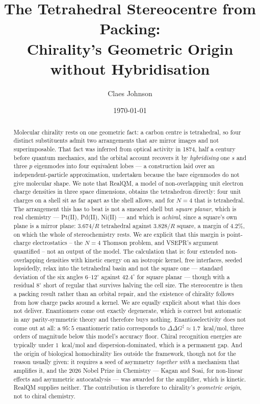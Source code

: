 \documentclass[11pt]{article}
\title{The Tetrahedral Stereocentre from Packing:\\
\large Chirality's Geometric Origin without Hybridisation}
\author[1]{Claes Johnson}
\affil[1]{KTH Royal Institute of Technology, SE-100 44 Stockholm, Sweden\\
\small\texttt{claesjohnson@gmail.com}}
\date{\today}
\begin{document}
\maketitle

\begin{abstract}
Molecular chirality rests on one geometric fact: a carbon centre is tetrahedral, so four distinct
substituents admit two arrangements that are mirror images and not superimposable. That fact was
inferred from optical activity in 1874, half a century before quantum mechanics, and the orbital
account recovers it by \emph{hybridising} one $s$ and three $p$ eigenmodes into four equivalent
lobes --- a construction laid over an independent-particle approximation, undertaken because the
bare eigenmodes do not give molecular shape. We note that RealQM, a model of non-overlapping unit
electron charge densities in three space dimensions, obtains the tetrahedron directly: four unit
charges on a shell sit as far apart as the shell allows, and for $N=4$ that is tetrahedral. The
arrangement this has to beat is not a smeared shell but \emph{square planar}, which is real
chemistry --- Pt(II), Pd(II), Ni(II) --- and which is \emph{achiral}, since a square's own plane is
a mirror plane: $3.674/R$ tetrahedral against $3.828/R$ square, a margin of $4.2\%$, on which the
whole of stereochemistry rests. We are explicit that this margin is point-charge electrostatics --
the $N=4$ Thomson problem, and VSEPR's argument quantified -- not an output of the model. The
calculation that is: four extended non-overlapping densities with kinetic energy on an isotropic
kernel, free interfaces, seeded lopsidedly, relax into the tetrahedral basin and not the square one
--- standard deviation of the six angles $6$--$12^\circ$ against $42.4^\circ$ for square planar ---
though with a residual $8^\circ$ short of regular that survives halving the cell size.
The stereocentre is then a packing result rather than an orbital repair, and the existence of
chirality follows from how charge packs around a kernel. We are equally explicit about what this
does not deliver. Enantiomers come out exactly degenerate, which is correct but automatic in any
parity-symmetric theory and therefore buys nothing. Enantioselectivity does not come out at all:
a $95{:}5$ enantiomeric ratio corresponds to $\Delta\Delta G^{\ddagger} \approx 1.7$~kcal/mol,
three orders of magnitude below this model's accuracy floor. Chiral recognition energies are
typically under $1$~kcal/mol and dispersion-dominated, which is a permanent gap. And the origin of
biological homochirality lies outside the framework, though not for the reason usually given: it
requires a seed of asymmetry \emph{together with} a mechanism that amplifies it, and the 2026 Nobel
Prize in Chemistry --- Kagan and Soai, for non-linear effects and asymmetric autocatalysis --- was
awarded for the amplifier, which is kinetic. RealQM supplies neither. The contribution is therefore
to chirality's \emph{geometric origin}, not to chiral chemistry.
\end{abstract}
\end{document}
